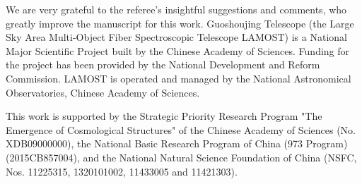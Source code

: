\documentclass[usenatbib]{raa}
\begin{document}
 
\begin{acknowledgements}
We are very grateful to the referee's insightful suggestions 
and comments,  who greatly improve the manuscript 
for this work.
Guoshoujing Telescope (the Large Sky Area Multi-Object Fiber Spectroscopic Telescope LAMOST)
is a National Major Scientific Project built by the Chinese Academy of Sciences. 
Funding for the project has been provided by the National Development and Reform Commission.
LAMOST is operated and managed by the National Astronomical Observatories, 
Chinese Academy of Sciences.

This work is supported by the Strategic Priority Research
Program "The Emergence of Cosmological Structures" of the Chinese Academy
of Sciences (No. XDB09000000), the National Basic Research Program of China
(973 Program)(2015CB857004), and the National Natural Science Foundation of 
China (NSFC, Nos. 11225315, 1320101002, 11433005 and 11421303).
 
\end{acknowledgements}


\end{document}
